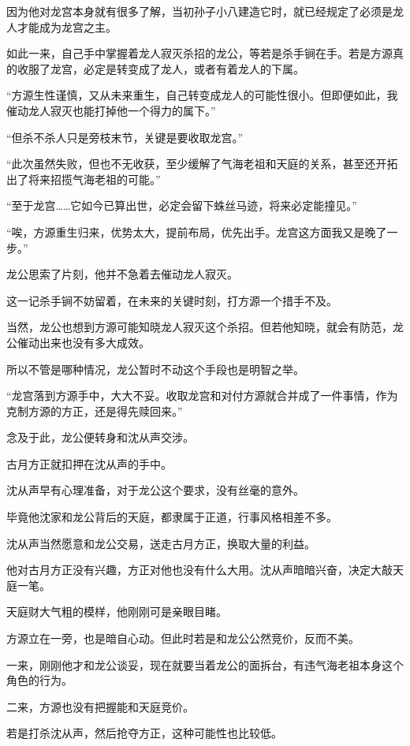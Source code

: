 \begin{this_body}
因为他对龙宫本身就有很多了解，当初孙子小八建造它时，就已经规定了必须是龙人才能成为龙宫之主。

如此一来，自己手中掌握着龙人寂灭杀招的龙公，等若是杀手锏在手。若是方源真的收服了龙宫，必定是转变成了龙人，或者有着龙人的下属。

“方源生性谨慎，又从未来重生，自己转变成龙人的可能性很小。但即便如此，我催动龙人寂灭也能打掉他一个得力的属下。”

“但杀不杀人只是旁枝末节，关键是要收取龙宫。”

“此次虽然失败，但也不无收获，至少缓解了气海老祖和天庭的关系，甚至还开拓出了将来招揽气海老祖的可能。”

“至于龙宫……它如今已算出世，必定会留下蛛丝马迹，将来必定能撞见。”

“唉，方源重生归来，优势太大，提前布局，优先出手。龙宫这方面我又是晚了一步。”

龙公思索了片刻，他并不急着去催动龙人寂灭。

这一记杀手锏不妨留着，在未来的关键时刻，打方源一个措手不及。

当然，龙公也想到方源可能知晓龙人寂灭这个杀招。但若他知晓，就会有防范，龙公催动出来也没有多大成效。

所以不管是哪种情况，龙公暂时不动这个手段也是明智之举。

“龙宫落到方源手中，大大不妥。收取龙宫和对付方源就合并成了一件事情，作为克制方源的方正，还是得先赎回来。”

念及于此，龙公便转身和沈从声交涉。

古月方正就扣押在沈从声的手中。

沈从声早有心理准备，对于龙公这个要求，没有丝毫的意外。

毕竟他沈家和龙公背后的天庭，都隶属于正道，行事风格相差不多。

沈从声当然愿意和龙公交易，送走古月方正，换取大量的利益。

他对古月方正没有兴趣，方正对他也没有什么大用。沈从声暗暗兴奋，决定大敲天庭一笔。

天庭财大气粗的模样，他刚刚可是亲眼目睹。

方源立在一旁，也是暗自心动。但此时若是和龙公公然竞价，反而不美。

一来，刚刚他才和龙公谈妥，现在就要当着龙公的面拆台，有违气海老祖本身这个角色的行为。

二来，方源也没有把握能和天庭竞价。

若是打杀沈从声，然后抢夺方正，这种可能性也比较低。


\end{this_body}
